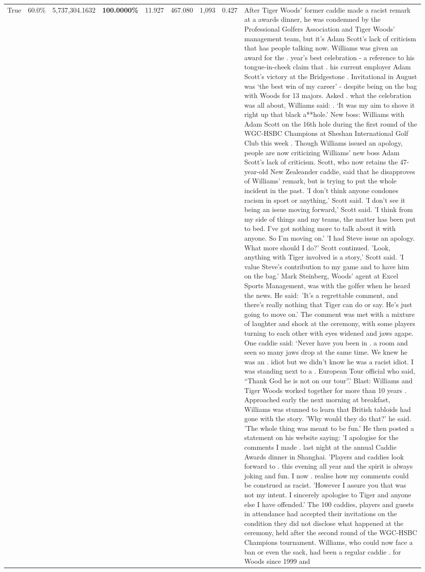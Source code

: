 \begin{table}[H]
\begin{tabular}{lllrlllll}
True & 60.0\% & 5,737,304.1632 & \bfseries \color{red} 100.0000\% & 11.927 & 467.080 & 1,093 & 0.427 & After Tiger Woods' former caddie made a racist remark at a awards dinner, he was condemned by the Professional Golfers Association and Tiger Woods' management team, but it's Adam Scott's lack of criticism that has people talking now. Williams was given an award for the . year’s best celebration - a reference to his tongue-in-cheek claim that . his current employer Adam Scott’s victory at the Bridgestone . Invitational in August was ‘the best win of my career’ - despite being on the bag with Woods for 13 majors. Asked . what the celebration was all about, Williams said: . ‘It was my aim to shove it right up that black a**hole.’ New boss: Williams with Adam Scott  on the 16th hole during the first round of the WGC-HSBC Champions at Sheshan International Golf Club this week . Though Williams issued an apology, people are now criticizing Williams' new boss Adam Scott's lack of criticism. Scott, who now retains the 47-year-old New Zealeander caddie, said that he disapproves of Williams' remark, but is trying to put the whole incident in the past. 'I don't think anyone condones racism in sport or anything,' Scott said. 'I don't see it being an issue moving forward,' Scott said. 'I think from my side of things and my teams, the matter has been put to bed. I've got nothing more to talk about it with anyone. So I'm moving on.' 'I had Steve issue an apology. What more should I do?' Scott continued. 'Look, anything with Tiger involved is a story,' Scott said. 'I value Steve's contribution to my game and to have him on the bag.' Mark Steinberg, Woods' agent at Excel Sports Management, was with the golfer when he heard the news. He said: 'It's a regrettable comment, and there's really nothing that Tiger can do or say. He's just going to move on.' The comment was met with a mixture of laughter and shock at the ceremony, with some players turning to each other with eyes widened and jaws agape. One caddie said: ‘Never have you been in . a room and seen so many jaws drop at the same time. We knew he was an . idiot but we didn’t know he was a racist idiot. I was standing next to a . European Tour official who said, “Thank God he is not on our tour”.’ Blast: Williams and Tiger Woods worked together for more than 10 years . Approached early the next morning at breakfast, Williams was stunned to learn that British tabloids had gone with the story. 'Why would they do that?' he said. 'The whole thing was meant to be fun.' He then posted a statement on his website saying: 'I apologise for the comments I made . last night at the annual Caddie Awards dinner in Shanghai. 'Players and caddies look forward to . this evening all year and the spirit is always joking and fun. I now . realise how my comments could be construed as racist. 'However I assure you that was not my intent. I sincerely apologise to Tiger and anyone else I have offended.' The 100 caddies, players and guests in attendance had accepted their invitations on the condition they did not disclose what happened at the ceremony, held after the second round of the WGC-HSBC Champions tournament. Williams, who could now face a ban or even the sack, had been a regular caddie . for Woods since 1999 and 
\end{tabular}
\end{table}
